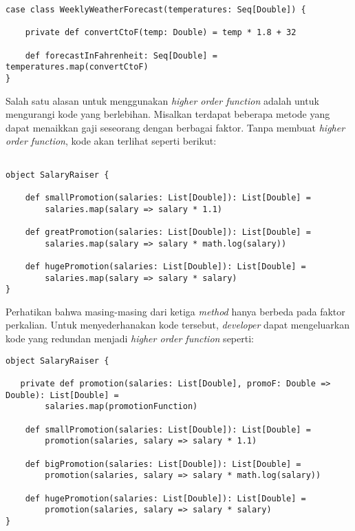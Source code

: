 \begin{verbatim}
case class WeeklyWeatherForecast(temperatures: Seq[Double]) {

    private def convertCtoF(temp: Double) = temp * 1.8 + 32 

    def forecastInFahrenheit: Seq[Double] = temperatures.map(convertCtoF) 
}
\end{verbatim}


Salah satu alasan untuk menggunakan \textit{higher order function} adalah untuk mengurangi kode yang berlebihan. Misalkan terdapat beberapa metode yang dapat menaikkan gaji seseorang dengan berbagai faktor. Tanpa membuat \textit{higher order function}, kode akan terlihat seperti berikut:

\begin{verbatim}

object SalaryRaiser {

    def smallPromotion(salaries: List[Double]): List[Double] =
        salaries.map(salary => salary * 1.1)

  	def greatPromotion(salaries: List[Double]): List[Double] =
        salaries.map(salary => salary * math.log(salary))

  	def hugePromotion(salaries: List[Double]): List[Double] =
        salaries.map(salary => salary * salary)
}
\end{verbatim}

Perhatikan bahwa masing-masing dari ketiga \textit{method} hanya berbeda pada faktor perkalian. Untuk menyederhanakan kode tersebut, \textit{developer} dapat mengeluarkan kode yang redundan menjadi \textit{higher order function} seperti:

\begin{verbatim}
object SalaryRaiser {

   private def promotion(salaries: List[Double], promoF: Double => Double): List[Double] =
        salaries.map(promotionFunction)  

  	def smallPromotion(salaries: List[Double]): List[Double] =
        promotion(salaries, salary => salary * 1.1)

  	def bigPromotion(salaries: List[Double]): List[Double] =
        promotion(salaries, salary => salary * math.log(salary))

  	def hugePromotion(salaries: List[Double]): List[Double] =
        promotion(salaries, salary => salary * salary)
}
\end{verbatim}





